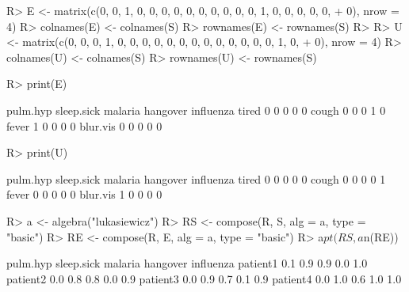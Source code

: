 \documentclass{article}\usepackage[]{graphicx}\usepackage[]{color}
\begin{document}
\begin{Schunk}
\begin{Sinput}
R> E <- matrix(c(0, 0, 1, 0, 0, 0, 0, 0, 0, 0, 0, 0, 0, 1, 0, 0, 0, 0, 0, 
+      0), nrow = 4)
R> colnames(E) <- colnames(S)
R> rownames(E) <- rownames(S)
R> 
R> U <- matrix(c(0, 0, 0, 1, 0, 0, 0, 0, 0, 0, 0, 0, 0, 0, 0, 0, 0, 1, 0, 
+      0), nrow = 4)
R> colnames(U) <- colnames(S)
R> rownames(U) <- rownames(S)
\end{Sinput}
\end{Schunk}

\begin{Schunk}
% --begin: "comp.e"
\begin{Sinput}
R> print(E)
\end{Sinput}
\begin{Soutput}
         pulm.hyp sleep.sick malaria hangover influenza
tired           0          0       0        0         0
cough           0          0       0        1         0
fever           1          0       0        0         0
blur.vis        0          0       0        0         0
\end{Soutput}
%
% --end: "comp.e"
\end{Schunk}

\begin{Schunk}
% --begin: "comp.u"
\begin{Sinput}
R> print(U)
\end{Sinput}
\begin{Soutput}
         pulm.hyp sleep.sick malaria hangover influenza
tired           0          0       0        0         0
cough           0          0       0        0         1
fever           0          0       0        0         0
blur.vis        1          0       0        0         0
\end{Soutput}
%
% --end: "comp.u"
\end{Schunk}

\begin{Schunk}
% --begin: "comp.circ.excl"
\begin{Sinput}
R> a <- algebra("lukasiewicz")
R> RS <- compose(R, S, alg = a, type = "basic")
R> RE <- compose(R, E, alg = a, type = "basic")
R> a$pt(RS, a$n(RE))
\end{Sinput}
\begin{Soutput}
         pulm.hyp sleep.sick malaria hangover influenza
patient1      0.1        0.9     0.9      0.0       1.0
patient2      0.0        0.8     0.8      0.0       0.9
patient3      0.0        0.9     0.7      0.1       0.9
patient4      0.0        1.0     0.6      1.0       1.0
\end{Soutput}
%
% --end: "comp.circ.excl"
\end{Schunk}
\end{document}
